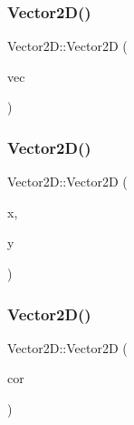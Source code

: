\mbox{\label{classsc_1_1_vector2_d_ab9cb563219c3b9f5156c403a92ed4181}} 
\subsubsection{\texorpdfstring{Vector2D()}{Vector2D()}\hspace{0.1cm}{\footnotesize\ttfamily [3/5]}}
{\footnotesize\ttfamily Vector2\+D\+::\+Vector2D (\begin{DoxyParamCaption}\item[{\mbox{\hyperlink{classsc_1_1_vector2_d}{Vector2D}} \&\&}]{vec }\end{DoxyParamCaption})}

\mbox{\label{classsc_1_1_vector2_d_a583d35d50c7f91179c9b9ef73f397cbc}} 
\subsubsection{\texorpdfstring{Vector2D()}{Vector2D()}\hspace{0.1cm}{\footnotesize\ttfamily [4/5]}}
{\footnotesize\ttfamily Vector2\+D\+::\+Vector2D (\begin{DoxyParamCaption}\item[{int}]{x,  }\item[{int}]{y }\end{DoxyParamCaption})}

\mbox{\label{classsc_1_1_vector2_d_a5679ccdf1c3ea3a125a79f88e2f39c79}} 
\subsubsection{\texorpdfstring{Vector2D()}{Vector2D()}\hspace{0.1cm}{\footnotesize\ttfamily [5/5]}}
{\footnotesize\ttfamily Vector2\+D\+::\+Vector2D (\begin{DoxyParamCaption}\item[{const C\+O\+O\+RD \&}]{cor }\end{DoxyParamCaption})}

